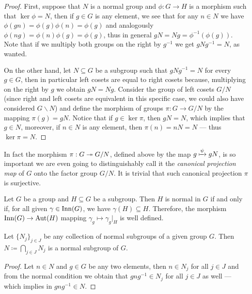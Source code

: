 \begin{proof}
First, suppose that \(N\) is a normal group and \(\phi: G \to H\) is a morphism
such that \(\ker \phi = N\), then if \(g \in G\) is any element, we see that for
any \(n \in N\) we have \(\phi(g n) = \phi(g) \phi(n) = \phi(g)\) and
analogously \(\phi(n g) = \phi(n) \phi(g) = \phi(g)\), thus in general \(g N = N
g = \phi^{-1}(\phi(g))\). Note that if we multiply both groups on the right by
\(g^{-1}\) we get \(g N g^{-1} = N\), as wanted.

On the other hand, let \(N \subseteq G\) be a subgroup such that \(g N g^{-1} =
N\) for every \(g \in G\), then in particular left cosets are equal to right
cosets because, multiplying on the right by \(g\) we obtain \(g N = N
g\). Consider the group of left cosets \(G/N\) (since right and left cosets are
equivalent in this specific case, we could also have considered \(G \backslash
N\)) and define the morphism of groups \(\pi: G \to G/N\) by the mapping
\(\pi(g) = g N\). Notice that if \(g \in \ker \pi\), then \(g N = N\), which
implies that \(g \in N\), moreover, if \(n \in N\) is any element, then
\(\pi(n) = n N = N\) --- thus \(\ker \pi = N\).
\end{proof}

In fact the morphism \(\pi: G \twoheadrightarrow G/N\), defined above by the map \(g \xmapsto
\psi g N\), is so important we are even going to distinguishably call it the
\emph{canonical projection map} of \(G\) onto the factor group \(G/N\). It is
trivial that such canonical projection \(\pi\) is surjective.

\begin{corollary}
\label{prop:normal-and-inner-automorphism-group}
Let \(G\) be a group and \(H \subseteq G\) be a subgroup. Then \(H\) is normal
in \(G\) if and only if, for all given \(\gamma \in \operatorname{Inn}(G)\), we have
\(\gamma(H) \subseteq H\). Therefore, the morphism \(\operatorname{Inn}(G) \to \operatorname{Aut}(H)\)
mapping \(\gamma_g \mapsto \gamma_g|_H\) is well defined.
\end{corollary}

\begin{corollary}
\label{cor:intersection-normal-subgroups}
Let \(\{N_{j}\}_{j \in J}\) be any collection of normal subgroups of a given
group \(G\). Then \(N \coloneq \bigcap_{j \in J} N_j\) is a normal subgroup of
\(G\).
\end{corollary}

\begin{proof}
Let \(n \in N\) and \(g \in G\) be any two elements, then \(n \in N_j\) for all
\(j \in J\) and from the normal condition we obtain that \(g n g^{-1} \in N_j\)
for all \(j \in J\) as well --- which implies in \(g n g^{-1} \in N\).
\end{proof}

